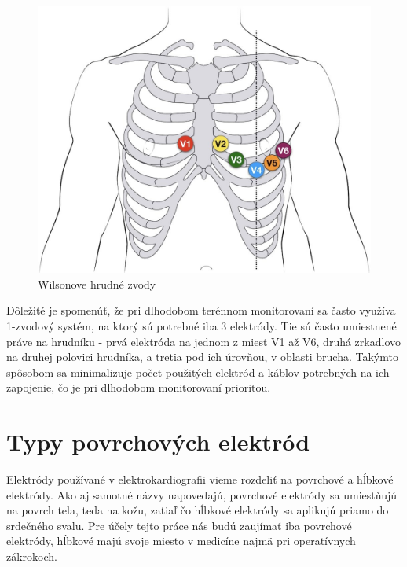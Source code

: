 \begin{figure}[H]
    \centering
    \includegraphics[scale=0.25]{img/12-lead-ECG-lead-placemnet.jpg}
    \caption{Wilsonove hrudné zvody\cite{Cadogan_2022}}
    \label{fig:wilson}
\end{figure}

Dôležité je spomenúť, že pri dlhodobom terénnom monitorovaní sa často využíva 1-zvodový systém, na ktorý sú potrebné iba 3 elektródy. Tie sú často umiestnené práve na hrudníku - prvá elektróda na jednom z miest V1 až V6, druhá zrkadlovo na druhej polovici hrudníka, a tretia pod ich úrovňou, v oblasti brucha. Takýmto spôsobom sa minimalizuje počet použitých elektród a káblov potrebných na ich zapojenie, čo je pri dlhodobom monitorovaní prioritou.\cite{Thakor1980}


\section{Typy povrchových elektród}

Elektródy používané v elektrokardiografii vieme rozdeliť na povrchové a hĺbkové elektródy. Ako aj samotné názvy napovedajú, povrchové elektródy sa umiestňujú na povrch tela, teda na kožu, zatiaľ čo hĺbkové elektródy sa aplikujú priamo do srdečného svalu. Pre účely tejto práce nás budú zaujímať iba povrchové elektródy, hĺbkové majú svoje miesto v medicíne najmä pri operatívnych zákrokoch. 

